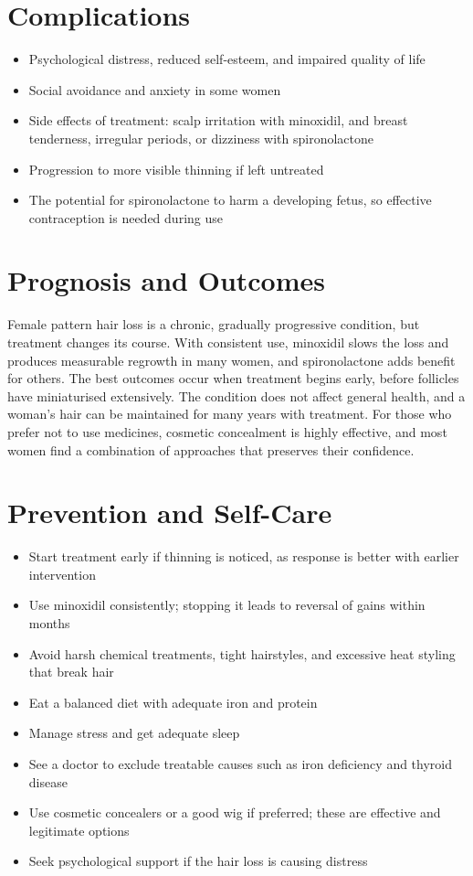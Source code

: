 \section*{Complications}
\begin{itemize}
    \item Psychological distress, reduced self-esteem, and impaired quality of life
    \item Social avoidance and anxiety in some women
    \item Side effects of treatment: scalp irritation with minoxidil, and breast tenderness, irregular periods, or dizziness with spironolactone
    \item Progression to more visible thinning if left untreated
    \item The potential for spironolactone to harm a developing fetus, so effective contraception is needed during use
\end{itemize}

\section*{Prognosis and Outcomes}
Female pattern hair loss is a chronic, gradually progressive condition, but treatment changes its course. With consistent use, minoxidil slows the loss and produces measurable regrowth in many women, and spironolactone adds benefit for others. The best outcomes occur when treatment begins early, before follicles have miniaturised extensively. The condition does not affect general health, and a woman's hair can be maintained for many years with treatment. For those who prefer not to use medicines, cosmetic concealment is highly effective, and most women find a combination of approaches that preserves their confidence.

\section*{Prevention and Self-Care}
\begin{itemize}
    \item Start treatment early if thinning is noticed, as response is better with earlier intervention
    \item Use minoxidil consistently; stopping it leads to reversal of gains within months
    \item Avoid harsh chemical treatments, tight hairstyles, and excessive heat styling that break hair
    \item Eat a balanced diet with adequate iron and protein
    \item Manage stress and get adequate sleep
    \item See a doctor to exclude treatable causes such as iron deficiency and thyroid disease
    \item Use cosmetic concealers or a good wig if preferred; these are effective and legitimate options
    \item Seek psychological support if the hair loss is causing distress
\end{itemize}

